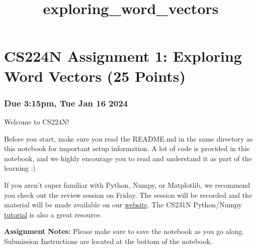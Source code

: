 \documentclass[11pt]{article}
\title{exploring\_word\_vectors}
\begin{document}
    
    \maketitle
    
    

    
    \section{CS224N Assignment 1: Exploring Word Vectors (25
Points)}\label{cs224n-assignment-1-exploring-word-vectors-25-points}

\subsubsection{\texorpdfstring{ Due 3:15pm, Tue Jan 16
2024}{ Due 3:15pm, Tue Jan 16 2024}}\label{due-315pm-tue-jan-16-2024}

Welcome to CS224N!

Before you start, make sure you read the README.md in the same directory
as this notebook for important setup information. A lot of code is
provided in this notebook, and we highly encourage you to read and
understand it as part of the learning :)

If you aren't super familiar with Python, Numpy, or Matplotlib, we
recommend you check out the review session on Friday. The session will
be recorded and the material will be made available on our
\href{http://web.stanford.edu/class/cs224n/index.html#schedule}{website}.
The CS231N Python/Numpy
\href{https://cs231n.github.io/python-numpy-tutorial/}{tutorial} is also
a great resource.

\textbf{Assignment Notes:} Please make sure to save the notebook as you
go along. Submission Instructions are located at the bottom of the
notebook.
\end{document}
